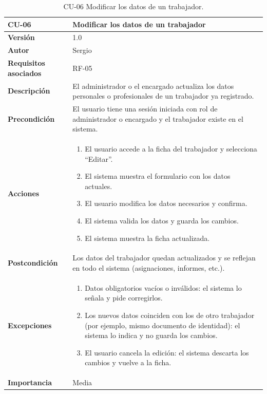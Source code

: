 \begin{table}[p]
	\centering
	\begin{tabularx}{\linewidth}{ p{} p{} }
		\toprule
		\textbf{CU-06}    & \textbf{Modificar los datos de un trabajador}\\
		\toprule
		\textbf{Versión}              & 1.0    \\
		\textbf{Autor}                & Sergio \\
		\textbf{Requisitos asociados} & RF-05 \\
		\textbf{Descripción}          & El administrador o el encargado actualiza los datos personales o profesionales de un trabajador ya registrado. \\
		\textbf{Precondición}         & El usuario tiene una sesión iniciada con rol de administrador o encargado y el trabajador existe en el sistema. \\
		\textbf{Acciones}             &
		\begin{enumerate}
			\def\labelenumi{\arabic{enumi}.}
			\tightlist
			\item El usuario accede a la ficha del trabajador y selecciona ``Editar''.
			\item El sistema muestra el formulario con los datos actuales.
			\item El usuario modifica los datos necesarios y confirma.
			\item El sistema valida los datos y guarda los cambios.
			\item El sistema muestra la ficha actualizada.
		\end{enumerate}\\
		\textbf{Postcondición}        & Los datos del trabajador quedan actualizados y se reflejan en todo el sistema (asignaciones, informes, etc.). \\
		\textbf{Excepciones}          &
		\begin{enumerate}
			\def\labelenumi{\arabic{enumi}.}
			\tightlist
			\item Datos obligatorios vacíos o inválidos: el sistema lo señala y pide corregirlos.
			\item Los nuevos datos coinciden con los de otro trabajador (por ejemplo, mismo documento de identidad): el sistema lo indica y no guarda los cambios.
			\item El usuario cancela la edición: el sistema descarta los cambios y vuelve a la ficha.
		\end{enumerate}\\
		\textbf{Importancia}          & Media \\
		\bottomrule
	\end{tabularx}
	\caption{CU-06 Modificar los datos de un trabajador.}
\end{table}

